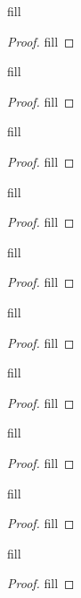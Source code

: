 \begin{exercise}{47}
fill
\end{exercise}
\begin{proof}
fill
\end{proof} 

\begin{exercise}{48}
fill
\end{exercise}
\begin{proof}
fill
\end{proof} 

\begin{exercise}{49}
fill
\end{exercise}
\begin{proof}
fill
\end{proof} 

\begin{exercise}{55}
fill
\end{exercise}
\begin{proof}
fill
\end{proof} 

\begin{exercise}{56}
fill
\end{exercise}
\begin{proof}
fill
\end{proof} 

\begin{exercise}{57}
fill
\end{exercise}
\begin{proof}
fill
\end{proof} 

\begin{exercise}{58}
fill
\end{exercise}
\begin{proof}
fill
\end{proof} 

\begin{exercise}{59}
fill
\end{exercise}
\begin{proof}
fill
\end{proof} 

\begin{exercise}{61}
fill
\end{exercise}
\begin{proof}
fill
\end{proof} 

\begin{exercise}{62}
fill
\end{exercise}
\begin{proof}
fill
\end{proof} 

